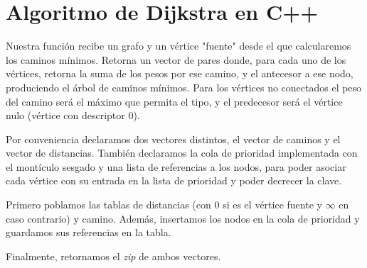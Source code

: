 \documentclass{article}
\begin{document}
\section{Algoritmo de Dijkstra en C++}
Nuestra función recibe un grafo y un vértice "fuente" desde el que calcularemos los caminos mínimos. Retorna un vector de pares donde, para cada uno de los vértices, retorna la suma de los pesos por ese camino, y el antecesor a ese nodo, produciendo el árbol de caminos mínimos. Para los vértices no conectados el peso del camino será el máximo que permita el tipo, y el predecesor será el vértice nulo (vértice con descriptor 0).

Por conveniencia declaramos dos vectores distintos, el vector de caminos y el vector de distancias. También declaramos la cola de prioridad implementada con el montículo sesgado y una lista de referencias a los nodos, para poder asociar cada vértice con su entrada en la lista de prioridad y poder decrecer la clave.

Primero poblamos las tablas de distancias (con 0 si es el vértice fuente y $\infty$ en caso contrario) y camino. Además, insertamos los nodos en la cola de prioridad y guardamos sus referencias en la tabla.

Finalmente, retornamos el \textit{zip} de ambos vectores.

\nocite{*} %


\end{document}
